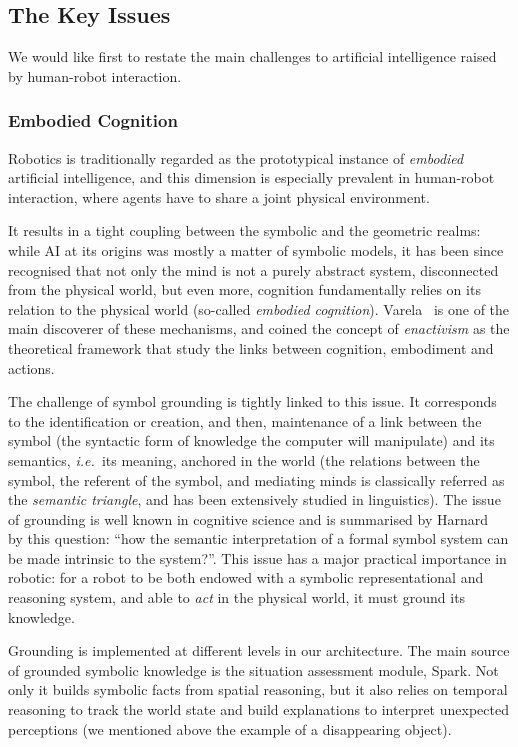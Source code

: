 \documentclass[preprint,3p,times]{elsarticle}
\newcommand{\ie}{{\textit{i.e.\ }}}
\begin{document}
\subsection{The Key Issues}

We would like first to restate the main challenges to artificial intelligence
raised by human-robot interaction.



\subsubsection{Embodied Cognition}

Robotics is traditionally regarded as the prototypical instance of \emph{embodied}
artificial intelligence, and this dimension is especially prevalent in
human-robot interaction, where agents have to share a joint physical
environment.

It results in a tight coupling between the symbolic and the geometric realms:
while AI at its origins was mostly a matter of symbolic models, it has been
since recognised that not only the mind is not a purely abstract system,
disconnected from the physical world, but even more, cognition fundamentally
relies on its relation to the physical world (so-called \emph{embodied
cognition}). Varela~\cite{Varela1992} is one of the main discoverer of these
mechanisms, and coined the concept of \emph{enactivism} as the theoretical
framework that study the links between cognition, embodiment and actions.

The challenge of symbol grounding is tightly linked to this issue. It
corresponds to the identification or creation, and then, maintenance of a link
between the symbol (the syntactic form of knowledge the computer will
manipulate) and its semantics, \ie its meaning, anchored in the world (the
relations between the symbol, the referent of the symbol, and mediating minds
is classically referred as the \emph{semantic triangle}, and has been
extensively studied in linguistics). The issue of grounding is well known in
cognitive science and is summarised by Harnard~\cite{Harnad1990} by this
question: ``how the semantic interpretation of a formal symbol system can be
made intrinsic to the system?''. This issue has a major practical importance in
robotic: for a robot to be both endowed with a symbolic representational and
reasoning system, and able to \emph{act} in the physical world, it must ground
its knowledge.

Grounding is implemented at different levels in our architecture. The main source
of grounded symbolic knowledge is the situation assessment module, {\sc Spark}.
Not only it builds symbolic facts from spatial reasoning, but it also relies on
temporal reasoning to track the world state and build explanations to interpret
unexpected perceptions (we mentioned above the example of a disappearing
object).
\end{document}
